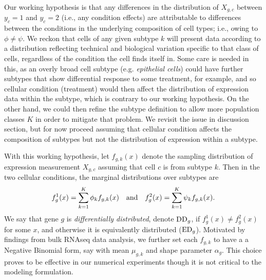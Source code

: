 \documentclass[11pt]{amsart}
\begin{document}
Our working hypothesis is that any differences in the distribution of $X_{g,c}$ 
between $y_c=1$ and $y_c=2$ (i.e., any condition effects) are attributable 
to differences between the conditions 
in the underlying composition of cell types; i.e.,
owing to $\phi \neq \psi$.  We reckon that cells of any given subtype $k$ will
present data according to a distribution reflecting technical 
and biological variation specific to that class of cells, regardless of the 
condition the cell finds itself in.   Some care is needed in this, as an overly
broad cell subtype (e.g. {\em epithelial cells}) could have
further subtypes that show differential response to some treatment, for example,
and so cellular condition (treatment) would then affect the distribution of 
expression data within the subtype, which is contrary to our working hypothesis.
On the other hand, we could then refine the subtype definition to allow more
population classes $K$ in order to mitigate that problem.
We revisit the issue in discussion section, but for now proceed assuming that cellular 
condition affects the composition of subtypes but not the distribution of expression
within a subtype.

With this working hypothesis, let $f_{g,k}(x)$ denote the sampling distribution
of expression measurement $X_{g,c}$ assuming that cell $c$ is from subtype $k$.
Then in the two cellular conditions, the marginal distributions over subtypes are
\begin{eqnarray*}
f_g^1(x) = \sum_{k=1}^K \phi_k f_{g,k} (x) \quad {\mbox {\rm and}} \quad
f_g^2(x) = \sum_{k=1}^K \psi_k f_{g,k} (x).
\end{eqnarray*}
We say that gene $g$ is {\em differentially distributed}, denote ${\rm DD}_g$,
if $f_g^1(x) \neq f_g^2(x)$ for some $x$, and otherwise it is equivalently distributed
(${\rm ED}_g$). Motivated by findings from bulk RNAseq data analysis, we further
set each $f_{g,k}$ to have a a Negative Binomial form, say with mean $\mu_{g,k}$
and shape parameter $\alpha_g$\cite{ref:Leng}. This choice
proves to be effective in our numerical experiments though it is not critical to
the modeling formulation.
\end{document}
